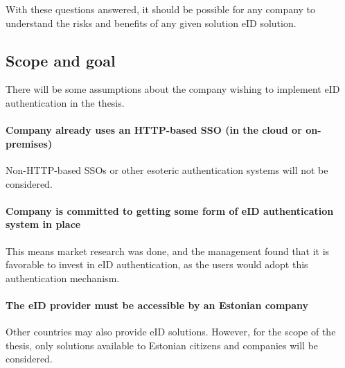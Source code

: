 With these questions answered, it should be possible for any company to understand the risks and benefits of any given solution eID solution.

\subsection{Scope and goal}

There will be some assumptions about the company wishing to implement eID authentication in the thesis.

\paragraph{Company already uses an HTTP-based SSO (in the cloud or on-premises)} Non-HTTP-based SSOs or other esoteric authentication systems will not be considered.

\paragraph{Company is committed to getting some form of eID authentication system in place} This means market research was done, and the management found that it is favorable to invest in eID authentication, as the users would adopt this authentication mechanism.

\paragraph{The eID provider must be accessible by an Estonian company} Other countries may also provide eID solutions. However, for the scope of the thesis, only solutions available to Estonian citizens and companies will be considered.







